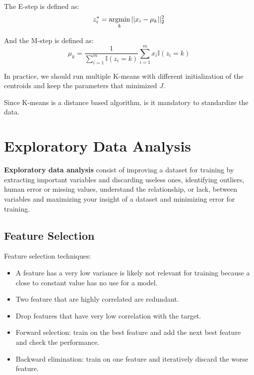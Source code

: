 \documentclass[12pt]{report}
\newcommand{\argmin}{\operatornamewithlimits{argmin}}
\begin{document}
            The E-step is defined as:
            \begin{equation}
                z_i^{*} = \argmin_{k} ||x_i - \mu_k||_2^2
            \end{equation}
            
            And the M-step is defined as:
            \begin{equation}
                \mu_k = \frac{1}{\sum_{i=1}^m \mathbb{I}(z_i = k)} \sum_{i=1}^m  x_i\mathbb{I}(z_i = k)
            \end{equation}
            
            In practice, we should run multiple K-means with different initialization of the centroids and keep the parameters that minimized $J$.

            Since K-means is a distance based algorithm, is it mandatory to standardize the data. 
            
            
            
\chapter{Exploratory Data Analysis}
    \textbf{Exploratory data analysis} consist of improving a dataset for training by extracting important variables and discarding useless ones, identifying outliers, human error or missing values, understand the relationship, or lack, between variables and maximizing your insight of a dataset and minimizing error for training.
    
    
    \section{Feature Selection}
        Feature selection techniques:
        \begin{itemize}
            \item A feature has a very low variance is likely not relevant for training because a close to constant value has no use for a model.
            \item Two feature that are highly correlated are redundant.
            \item Drop features that have very low correlation with the target.
            \item Forward selection: train on the best feature and add the next best feature and check the performance.
            \item Backward elimination: train on one feature and iteratively discard the worse feature.
        \end{itemize}
    
\end{document}
